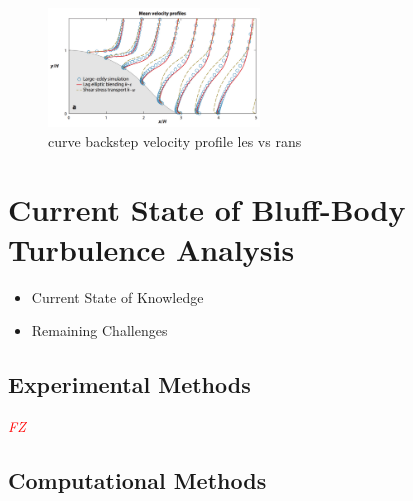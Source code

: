 \documentclass[journal]{new-aiaa}
\begin{document}
\begin{figure}[H]
\begin{center}
\includegraphics[width=0.5\textwidth]{Images/logan/durbin2018some_BackstepLESvsRANS.pdf}
\caption{curve backstep velocity profile les vs rans \cite{durbin2018some}}
\label{fig:lesvsransbackstep}
\end{center}
\end{figure}










\section{Current State of Bluff-Body Turbulence Analysis} \label{sec:currentstate}

\begin{itemize}
    \item Current State of Knowledge
    \item Remaining Challenges
\end{itemize}


\subsection{Experimental Methods} \label{subsec:currentstateexperimental}

\textcolor{red}{\emph{FZ}}


\subsection{Computational Methods} \label{subsec:currentstatecomputational}
\end{document}
